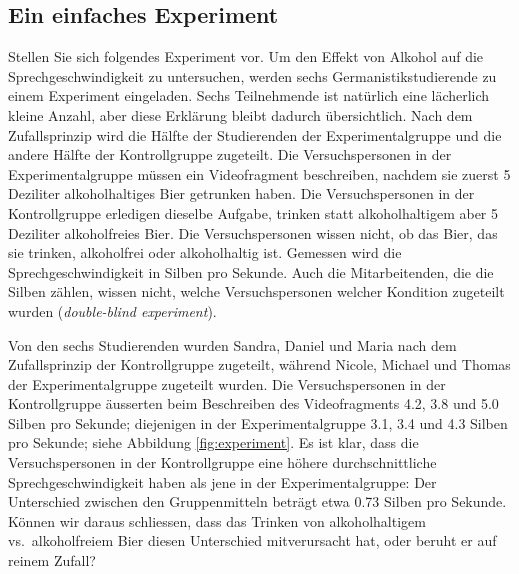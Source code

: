 \documentclass[oneside, 10pt]{book}\usepackage[]{graphicx}\usepackage[]{xcolor}
\begin{document}
\subsection{Ein einfaches Experiment}
Stellen Sie sich folgendes Experiment vor.
Um den Effekt von Alkohol auf die Sprechgeschwindigkeit zu untersuchen,
werden sechs Germanistikstudierende zu einem Experiment eingeladen.
Sechs Teilnehmende ist natürlich eine lächerlich kleine Anzahl,
aber diese Erklärung bleibt dadurch übersichtlich.
Nach dem Zufallsprinzip wird die Hälfte der Studierenden der Experimentalgruppe
und die andere Hälfte der Kontrollgruppe zugeteilt.
Die Versuchspersonen in der Experimentalgruppe müssen ein Videofragment
beschreiben, nachdem sie zuerst 5 Deziliter alkoholhaltiges
Bier getrunken haben. Die Versuchspersonen in der Kontrollgruppe erledigen
dieselbe Aufgabe, trinken statt alkoholhaltigem aber 5 Deziliter
alkoholfreies Bier. Die Versuchspersonen wissen nicht, ob das Bier,
das sie trinken, alkoholfrei oder alkoholhaltig ist. Gemessen wird
die Sprechgeschwindigkeit in Silben pro Sekunde.
Auch die Mitarbeitenden, die die Silben zählen, wissen
nicht, welche Versuchspersonen welcher Kondition zugeteilt
wurden (\textit{double-blind experiment}).

Von den sechs Studierenden wurden Sandra, Daniel und Maria
nach dem Zufallsprinzip der Kontrollgruppe zugeteilt, während Nicole,
Michael und Thomas der Experimentalgruppe zugeteilt wurden.
Die Versuchspersonen in der Kontrollgruppe äusserten beim Beschreiben des
Videofragments 4.2, 3.8 und 5.0 Silben pro Sekunde;
diejenigen in der Experimentalgruppe 3.1, 3.4 und 4.3 Silben pro Sekunde;
siehe Abbildung \ref{fig:experiment}.
Es ist klar, dass die Versuchspersonen in der
Kontrollgruppe eine höhere durchschnittliche Sprechgeschwindigkeit haben
als jene in der Experimentalgruppe: Der Unterschied zwischen
den Gruppenmitteln beträgt etwa 0.73 Silben pro Sekunde.
Können wir daraus schliessen,
dass das Trinken von alkoholhaltigem vs.\
alkoholfreiem Bier diesen Unterschied mitverursacht hat, oder beruht er auf reinem Zufall?
\end{document}
